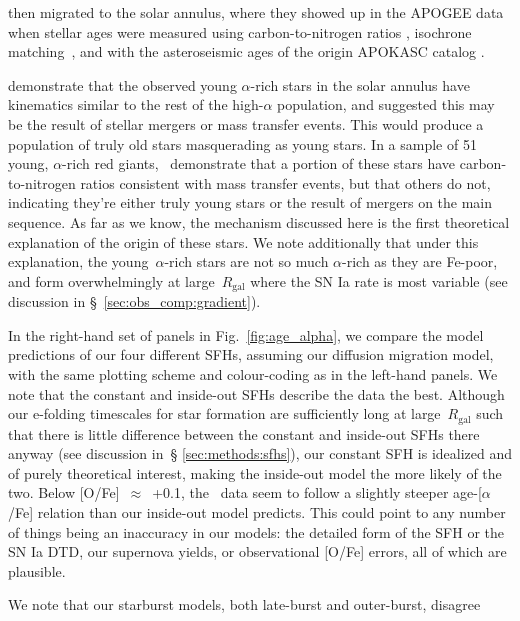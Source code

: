 \documentclass[fleqn, usenatbib]{mnras}
\begin{document}
then migrated to the solar annulus, where they showed up in the APOGEE data 
when stellar ages were measured using carbon-to-nitrogen ratios 
\citep{Martig2016}, isochrone matching~\citep{Feuillet2018, Feuillet2019}, 
and with the asteroseismic ages of the origin APOKASC catalog 
\citep{Chiappini2015, SilvaAguirre2018, Pinsonneault2014}. 
\par 
\citet{SilvaAguirre2018} demonstrate that the observed young $\alpha$-rich 
stars in the solar annulus have kinematics similar to the rest of the 
high-$\alpha$ population, and suggested this may be the result of stellar 
mergers or mass transfer events. This would produce a population of truly old 
stars masquerading as young stars. In a sample of 51 young, $\alpha$-rich 
red giants,~\citet{Hekker2019} demonstrate that a portion of these stars have 
carbon-to-nitrogen ratios consistent with mass transfer events, but that others 
do not, indicating they're either truly young stars or the result of mergers 
on the main sequence. As far as we know, the mechanism discussed here is the 
first theoretical explanation of the origin of these stars. We note 
additionally that under this explanation, the young~$\alpha$-rich stars are 
not so much $\alpha$-rich as they are Fe-poor, and form overwhelmingly at 
large~$R_\text{gal}$ where the SN Ia rate is most variable (see discussion in 
\S~\ref{sec:obs_comp:gradient}). 
\par 
In the right-hand set of panels in Fig.~\ref{fig:age_alpha}, we 
compare the model predictions of our four different SFHs, assuming our 
diffusion migration model, with the same plotting scheme and colour-coding as 
in the left-hand panels. We note that the constant and inside-out SFHs describe 
the data the best. Although our e-folding timescales for star formation are 
sufficiently long at large~$R_\text{gal}$ such that there is little difference 
between the constant and inside-out SFHs there anyway (see discussion in~\S 
\ref{sec:methods:sfhs}), our constant SFH is idealized and of purely 
theoretical interest, making the inside-out model the more likely of the two. 
Below [O/Fe]~$\approx$~+0.1, the~\citet{Feuillet2019} data seem to follow a 
slightly steeper age-[$\alpha$/Fe] relation than our inside-out model 
predicts. This could point to any number of things being an inaccuracy in our 
models: the detailed form of the SFH or the SN Ia DTD, our supernova yields, 
or observational [O/Fe] errors, all of which are plausible. 
\par 
We note that our starburst models, both late-burst and outer-burst, disagree 
\end{document}
